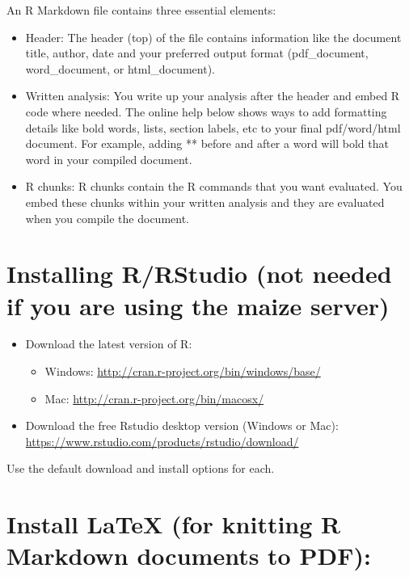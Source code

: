 \documentclass[
]{book}
\providecommand{\tightlist}{%
  \setlength{\itemsep}{0pt}\setlength{\parskip}{0pt}}
\begin{document}
An R Markdown file contains three essential elements:

\begin{itemize}
\item
  Header: The header (top) of the file contains information like the document title, author, date and your preferred output format (pdf\_document, word\_document, or html\_document).
\item
  Written analysis: You write up your analysis after the header and embed R code where needed. The online help below shows ways to add formatting details like bold words, lists, section labels, etc to your final pdf/word/html document. For example, adding ** before and after a word will bold that word in your compiled document.
\item
  R chunks: R chunks contain the R commands that you want evaluated. You embed these chunks within your written analysis and they are evaluated when you compile the document.
\end{itemize}

\hypertarget{installing-rrstudio-not-needed-if-you-are-using-the-maize-server}{%
\section{Installing R/RStudio (not needed if you are using the maize server)}\label{installing-rrstudio-not-needed-if-you-are-using-the-maize-server}}

\begin{itemize}
\tightlist
\item
  Download the latest version of R:

  \begin{itemize}
  \tightlist
  \item
    Windows: \url{http://cran.r-project.org/bin/windows/base/}
  \item
    Mac: \url{http://cran.r-project.org/bin/macosx/}
  \end{itemize}
\item
  Download the free Rstudio desktop version (Windows or Mac): \url{https://www.rstudio.com/products/rstudio/download/}
\end{itemize}

Use the default download and install options for each.

\hypertarget{install-latex-for-knitting-r-markdown-documents-to-pdf}{%
\section{Install LaTeX (for knitting R Markdown documents to PDF):}\label{install-latex-for-knitting-r-markdown-documents-to-pdf}}
\end{document}
